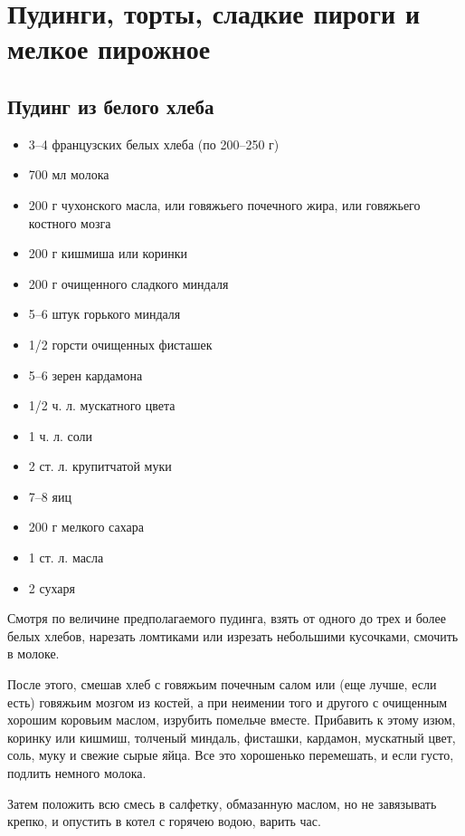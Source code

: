 \newpage
\section{Пудинги, торты, сладкие пироги и мелкое пирожное}

\subsection{Пудинг из белого хлеба}

\begin{itemize}
	\item 3–4 французских белых хлеба (по 200–250 г) 
    \item 700 мл молока 
    \item 200 г чухонского масла, или говяжьего почечного жира, или говяжьего костного мозга 
    \item 200 г кишмиша или коринки 
    \item 200 г очищенного сладкого миндаля 
    \item 5–6 штук горького миндаля 
    \item 1/2 горсти очищенных фисташек 
    \item 5–6 зерен кардамона 
    \item 1/2 ч. л. мускатного цвета 
    \item 1 ч. л. соли 
    \item 2 ст. л. крупитчатой муки 
    \item 7–8 яиц 
    \item 200 г мелкого сахара 
    \item 1 ст. л. масла 
    \item 2 сухаря
\end{itemize}

Смотря по величине предполагаемого пудинга, взять от одного до трех и более белых хлебов, нарезать ломтиками или изрезать небольшими кусочками, смочить в молоке.

После этого, смешав хлеб с говяжьим почечным салом или (еще лучше, если есть) говяжьим мозгом из костей, а при неимении того и другого с очищенным хорошим коровьим маслом, изрубить помельче вместе. Прибавить к этому изюм, коринку или кишмиш, толченый миндаль, фисташки, кардамон, мускатный цвет, соль, муку и свежие сырые яйца. Все это хорошенько перемешать, и если густо, подлить немного молока.

Затем положить всю смесь в салфетку, обмазанную маслом, но не завязывать крепко, и опустить в котел с горячею водою, варить час.

